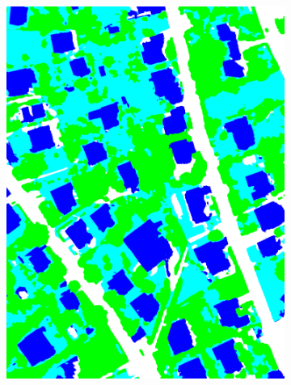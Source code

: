 \begin{figure}[htb]
\begin{subfigure}{0.24\textwidth}
   \includegraphics[width=1\linewidth]{fig/vai/23_manual.png}
   \caption{}
 \end{subfigure}
 \begin{subfigure}{0.24\textwidth}
   \centering

\end{subfigure}
\end{figure}
